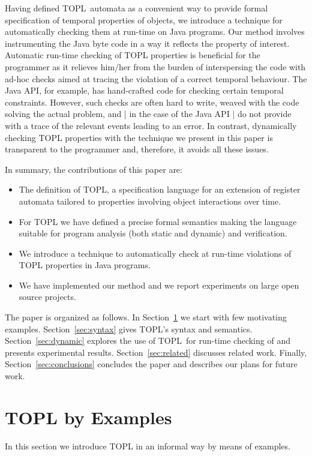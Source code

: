 \documentclass{sigplanconf}[10pt] %
\newcommand{\TPL}{TOPL}
\begin{document}
Having defined \TPL \ automata as a convenient way to provide formal specification of temporal properties
of objects,  we introduce a technique for automatically checking them at run-time on Java programs.
Our method involves instrumenting the Java byte code in a way it reflects the property of interest.
Automatic run-time checking of TOPL properties is beneficial for the programmer as
 it relieves him/her from the burden of 
interspersing the code with ad-hoc checks  aimed at tracing the violation of a correct temporal behaviour.
The Java API, for example, has hand-crafted code for checking certain temporal constraints.
However, such checks are often hard to write, weaved with the code solving the actual problem, and | in the case of the Java API |  do not provide with a trace of the relevant events leading to an error.
In contrast, dynamically checking TOPL properties  with the technique we present in this paper is transparent to the programmer and, therefore,  it avoids all these issues.

In summary, the contributions of this paper are:
\begin{itemize}
\item The definition of TOPL, a specification language for an extension of register automata tailored to
 properties involving object interactions over time. 
\item For TOPL we have defined a precise formal semantics making the language suitable for program analysis (both static and dynamic) and verification. 
\item We introduce a technique to automatically check at run-time violations of TOPL properties in Java programs.
\item We have implemented our method and we report experiments on large open source projects.
\end{itemize}

The paper is organized as follows. In Section~\ref{sec:examples} we start with few motivating examples.
Section~\ref{sec:syntax} gives  \TPL's syntax  and semantics.
Section~\ref{sec:dynamic} explores the use of \TPL \ for run-time checking of and presents experimental results. Section~\ref{sec:related} discusses related work.
Finally, Section~\ref{sec:conclusions} concludes the paper and describes our plans for future work.




\section{TOPL by Examples} \label{sec:examples} %
In this section we introduce TOPL in an informal way by means of examples.
\end{document}
